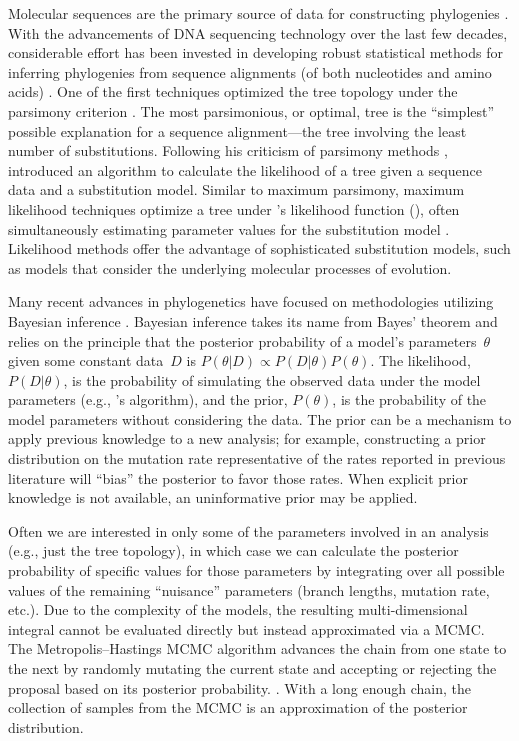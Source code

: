 \documentclass[12pt,letterpaper]{article}
\newcommand{\aposcite}[2]{\citeauthor{#1}'s #2 (\citeyear{#1})}
\begin{document}
Molecular sequences are the primary source of data for constructing phylogenies \parencite{Baum:2008}. With the advancements of DNA sequencing technology over the last few decades, considerable effort has been invested in developing robust statistical methods for inferring phylogenies from sequence alignments (of both nucleotides and amino acids) \parencite{Felsenstein:2005}. One of the first techniques optimized the tree topology under the parsimony criterion \parencite{Fitch:1971}. The most parsimonious, or optimal, tree is the \enquote{simplest} possible explanation for a sequence alignment---the tree involving the least number of substitutions. Following his criticism of parsimony methods \parencite{Felsenstein:1978}, \textcite{Felsenstein:1981} introduced an algorithm to calculate the likelihood of a tree given a sequence data and a substitution model. Similar to maximum parsimony, maximum likelihood techniques optimize a tree under \aposcite{Felsenstein:1981}{likelihood function}, often simultaneously estimating parameter values for the substitution model \parencite{Felsenstein:2005}. Likelihood methods offer the advantage of sophisticated substitution models, such as models that consider the underlying molecular processes of evolution.

Many recent advances in phylogenetics have focused on methodologies utilizing Bayesian inference \parencites{Ronquist:2012}{Drummond:2012}. Bayesian inference takes its name from Bayes' theorem \parencite{Bayes:1763} and relies on the principle that the posterior probability of a model's parameters~$\theta$ given some constant data~$D$ is $P\left(\theta|D\right) \propto P\left(D|\theta\right) P\left(\theta\right)$. The likelihood, $P\left(D|\theta\right)$, is the probability of simulating the observed data under the model parameters (e.g., \citeauthor{Felsenstein:1981}'s \citeyear{Felsenstein:1981} algorithm), and the prior, $P\left(\theta\right)$, is the probability of the model parameters without considering the data. The prior can be a mechanism to apply previous knowledge to a new analysis; for example, constructing a prior distribution on the mutation rate representative of the rates reported in previous literature will \enquote{bias} the posterior to favor those rates. When explicit prior knowledge is not available, an uninformative prior may be applied.

Often we are interested in only some of the parameters involved in an analysis (e.g., just the tree topology), in which case we can calculate the posterior probability of specific values for those parameters by integrating over all possible values of the remaining \enquote{nuisance} parameters (branch lengths, mutation rate, etc.). Due to the complexity of the models, the resulting multi-dimensional integral cannot be evaluated directly but instead approximated via a \ac{MCMC}. The Metropolis--Hastings \ac{MCMC} algorithm advances the chain from one state to the next by randomly mutating the current state and accepting or rejecting the proposal based on its posterior probability. \parencites{Metropolis:1953}{Hastings:1970}. With a long enough chain, the collection of samples from the \ac{MCMC} is an approximation of the posterior distribution.
\end{document}
